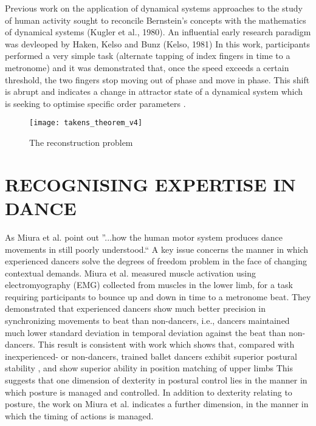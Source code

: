 \documentclass{sigchi}
\begin{document}
Previous work on the application of dynamical systems approaches to the study of human activity sought to 
reconcile Bernstein’s \cite{Bernstein1967} concepts with the mathematics of dynamical systems
(Kugler et al., 1980). 
An influential early research paradigm was devleoped by Haken, Kelso and Bunz (Kelso, 1981) \cite{Haken1985} %
In this work, participants performed a very simple task (alternate tapping of index fingers in time to a metronome)
and it was demonstrated that, once the speed exceeds a certain threshold, the two fingers stop moving 
out of phase and move in phase.  This shift is abrupt and indicates a change in attractor state of a 
dynamical system which is seeking to optimise specific order parameters \cite{Beek1995}.


\begin{figure}[htbp!] 
\centering    
\texttt{[image: takens\_theorem\_v4]}
\caption[PA]{The reconstruction problem}
\label{fig:takens_theorem}
\end{figure}



\section{RECOGNISING EXPERTISE IN DANCE}
As Miura et al. \cite{Miura2015} point out ''...how the human motor system produces dance movements in still 
poorly understood.`` A key issue concerns the manner in which experienced dancers solve the degrees of freedom 
problem in the face of changing contextual demands.  Miura et al. \cite{Miura2013} measured muscle activation 
using electromyography (EMG) collected from muscles in the lower limb, for a task requiring participants to 
bounce up and down in time to a metronome beat.  They demonstrated that experienced dancers show much better 
precision in synchronizing movements to beat than non-dancers, i.e., dancers maintained much lower standard 
deviation in temporal deviation against the beat than non-dancers. This result is consistent with work which 
shows that, compared with inexperienced- or non-dancers, trained ballet dancers exhibit superior postural 
stability \cite{Crotts1996} %
, and show superior ability in position matching of upper limbs \cite{Ramsay2001} %
This suggests that one dimension of dexterity in postural control lies in the manner in which posture is managed 
and controlled.  In addition to dexterity relating to posture, the work on Miura et al. \cite{Miura2013}  %
indicates a further dimension, in the manner in which the timing of actions is managed. 
\end{document}
